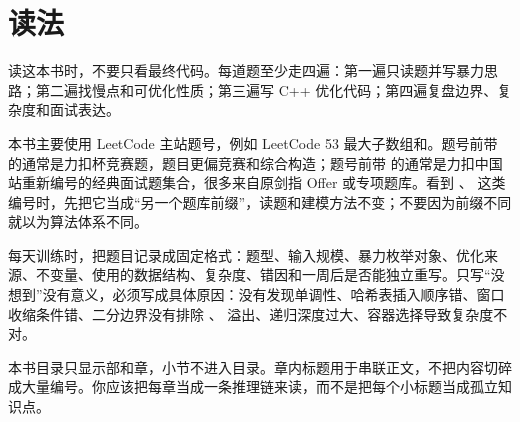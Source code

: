 \chapter*{读法}

读这本书时，不要只看最终代码。每道题至少走四遍：第一遍只读题并写暴力思路；第二遍找慢点和可优化性质；第三遍写 C++ 优化代码；第四遍复盘边界、复杂度和面试表达。

本书主要使用 LeetCode 主站题号，例如 LeetCode 53 最大子数组和。题号前带  的通常是力扣杯竞赛题，题目更偏竞赛和综合构造；题号前带  的通常是力扣中国站重新编号的经典面试题集合，很多来自原剑指 Offer 或专项题库。看到 、 这类编号时，先把它当成“另一个题库前缀”，读题和建模方法不变；不要因为前缀不同就以为算法体系不同。

每天训练时，把题目记录成固定格式：题型、输入规模、暴力枚举对象、优化来源、不变量、使用的数据结构、复杂度、错因和一周后是否能独立重写。只写“没想到”没有意义，必须写成具体原因：没有发现单调性、哈希表插入顺序错、窗口收缩条件错、二分边界没有排除 、 溢出、递归深度过大、容器选择导致复杂度不对。

本书目录只显示部和章，小节不进入目录。章内标题用于串联正文，不把内容切碎成大量编号。你应该把每章当成一条推理链来读，而不是把每个小标题当成孤立知识点。
